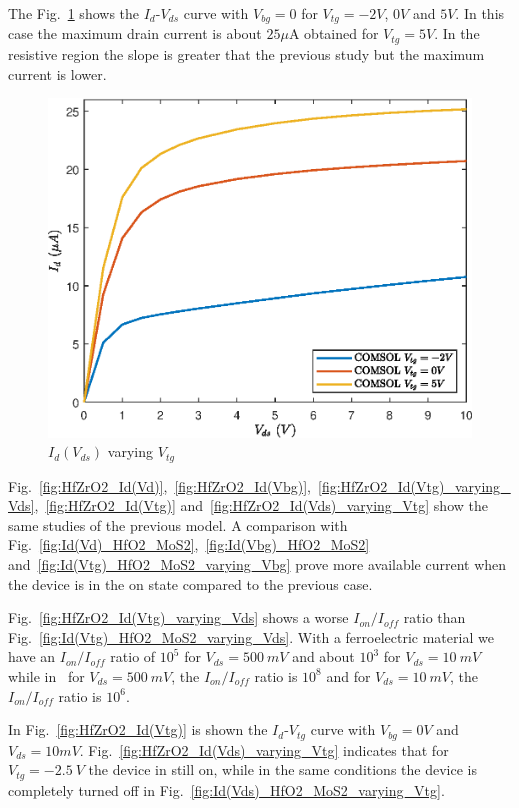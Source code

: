 \documentclass[12pt,a4paper,titlepage]{article}
\begin{document}
The Fig.~\ref{fig:HfZrO2_Id(Vd)_varying_Vtg_high_Vd} shows the $I_d$-$V_{ds}$ curve with $V_{bg} = 0$ for $V_{tg} = -2V$, $0V$ and $5V$. In this case the maximum drain current is about $25 \mu$A obtained for $V_{tg} = 5V$. In the resistive region the slope is greater that the previous study but the maximum current is lower.

\begin{figure}[h]
	\centering
	\includegraphics[width=.8\textwidth]{Grafici/HfZrO2_Id(Vd)_varying_Vtg_high_Vd.eps} 
	\caption{$I_d(V_{ds})$ varying $V_{tg}$}
	\label{fig:HfZrO2_Id(Vd)_varying_Vtg_high_Vd}
\end{figure} 


Fig.~\ref{fig:HfZrO2_Id(Vd)},~\ref{fig:HfZrO2_Id(Vbg)},~\ref{fig:HfZrO2_Id(Vtg)_varying_Vds},~\ref{fig:HfZrO2_Id(Vtg)} and~\ref{fig:HfZrO2_Id(Vds)_varying_Vtg} show the same studies of the previous model. A comparison with Fig.~\ref{fig:Id(Vd)_HfO2_MoS2},~\ref{fig:Id(Vbg)_HfO2_MoS2} and~\ref{fig:Id(Vtg)_HfO2_MoS2_varying_Vbg} prove more available current when the device is in the on state compared to the previous case.

Fig.~\ref{fig:HfZrO2_Id(Vtg)_varying_Vds} shows a worse $I_{on}/I_{off}$ ratio than Fig.~\ref{fig:Id(Vtg)_HfO2_MoS2_varying_Vds}. With a ferroelectric material we have an $I_{on}/I_{off}$ ratio of $10^5$ for $V_{ds}=500~mV$ and about $10^3$ for $V_{ds}=10~mV$ while in~\cite{Radisavljevic:Si_MoS2} for $V_{ds} = 500~mV$, the $I_{on}/I_{off}$ ratio is $10^8$ and for $V_{ds} = 10~mV$, the $I_{on}/I_{off}$ ratio is $10^6$.

In Fig.~\ref{fig:HfZrO2_Id(Vtg)} is shown the $I_d$-$V_{tg}$ curve with $V_{bg}=0V$ and $V_{ds} = 10 mV$.
Fig.~\ref{fig:HfZrO2_Id(Vds)_varying_Vtg} indicates that for $V_{tg} = -2.5~V$ the device in still on, while in the same conditions the device is completely turned off in Fig.~\ref{fig:Id(Vds)_HfO2_MoS2_varying_Vtg}.
\end{document}
